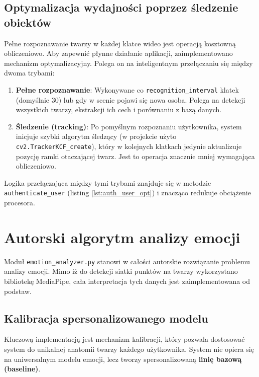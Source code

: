 \subsection{Optymalizacja wydajności poprzez śledzenie obiektów}
Pełne rozpoznawanie twarzy w każdej klatce wideo jest operacją kosztowną obliczeniowo. Aby zapewnić płynne działanie aplikacji, zaimplementowano mechanizm optymalizacyjny. Polega on na inteligentnym przełączaniu się między dwoma trybami:
\begin{enumerate}
    \item \textbf{Pełne rozpoznawanie}: Wykonywane co \texttt{recognition\_interval} klatek (domyślnie 30) lub gdy w scenie pojawi się nowa osoba. Polega na detekcji wszystkich twarzy, ekstrakcji ich cech i porównaniu z bazą danych.
    \item \textbf{Śledzenie (tracking)}: Po pomyślnym rozpoznaniu użytkownika, system inicjuje szybki algorytm śledzący (w projekcie użyto \texttt{cv2.TrackerKCF\_create}), który w kolejnych klatkach jedynie aktualizuje pozycję ramki otaczającej twarz. Jest to operacja znacznie mniej wymagająca obliczeniowo.
\end{enumerate}
Logika przełączająca między tymi trybami znajduje się w metodzie \texttt{authenticate\_user} (listing \ref{lst:auth_user_opt}) i znacząco redukuje obciążenie procesora.



\section{Autorski algorytm analizy emocji}
Moduł \texttt{emotion\_analyzer.py} stanowi w całości autorskie rozwiązanie problemu analizy emocji. Mimo iż do detekcji siatki punktów na twarzy wykorzystano bibliotekę MediaPipe, cała interpretacja tych danych jest zaimplementowana od podstaw.

\subsection{Kalibracja spersonalizowanego modelu}
Kluczową implementacją jest mechanizm kalibracji, który pozwala dostosować system do unikalnej anatomii twarzy każdego użytkownika. System nie opiera się na uniwersalnym modelu emocji, lecz tworzy spersonalizowaną \textbf{linię bazową (baseline)}.

